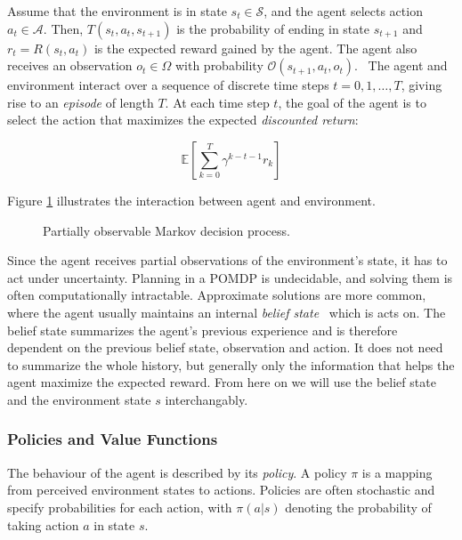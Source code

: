 Assume that the environment is in state \(s_t \in \mathcal{S}\), and the agent selects action \(a_t \in \mathcal{A}\).
Then, \(T(s_t, a_t, s_{t+1})\) is the probability of ending in state \(s_{t+1}\) and \(r_t = R(s_t, a_t)\) is the expected reward gained by the agent.
The agent also receives an observation \(o_t \in \Omega\) with probability \(\mathcal{O}(s_{t+1}, a_t, o_t)\).~\cite{kaelbling_pomdp_1998}
The agent and environment interact over a sequence of discrete time steps \(t = 0, 1, \dots, T\), giving rise to an \textit{episode} of length \(T\).
At each time step \(t\), the goal of the agent is to select the action that maximizes the expected \textit{discounted return}:

\[ 
    \mathbb{E} \left[ \sum_{k=0}^T \gamma^{k-t-1} r_k \right]
\]

Figure \ref{fig:pomdp} illustrates the interaction between agent and environment.

\begin{figure}
    \centering
    
    \label{fig:pomdp}
    \caption[Partially observable Markov decision process]{Partially observable Markov decision process.}
\end{figure}

Since the agent receives partial observations of the environment's state, it has to act under uncertainty.
Planning in a POMDP is undecidable, and solving them is often computationally intractable.
Approximate solutions are more common, where the agent usually maintains an internal \textit{belief state}~\cite{kaelbling_pomdp_1998} which is acts on.
The belief state summarizes the agent's previous experience and is therefore dependent on the previous belief state, observation and action.
It does not need to summarize the whole history, but generally only the information that helps the agent maximize the expected reward.
From here on we will use the belief state and the environment state \(s\) interchangably. 

\subsubsection{Policies and Value Functions}
\label{sec:policies-values}

The behaviour of the agent is described by its \textit{policy}.
A policy \(\pi\) is a mapping from perceived environment states to actions.
Policies are often stochastic and specify probabilities for each action, with \(\pi(a|s)\) denoting the probability of taking action \(a\) in state \(s\).~\cite{sutton_reinforcement_2018}

